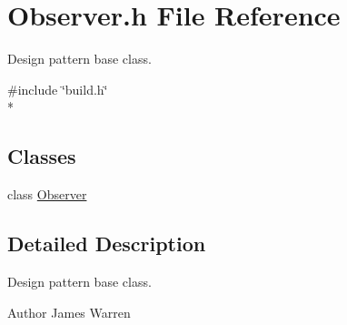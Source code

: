 \section{Observer.\-h File Reference}
\label{_observer_8h}


Design pattern base class.  


{\ttfamily \#include \char`\"{}build.\-h\char`\"{}}\\*
\subsection*{Classes}
\begin{DoxyCompactItemize}
\item 
class \hyperlink{class_observer}{Observer}
\end{DoxyCompactItemize}


\subsection{Detailed Description}
Design pattern base class. \begin{DoxyAuthor}{Author}
James Warren 
\end{DoxyAuthor}
